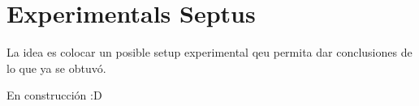 \chapter{Experimentals Septus}
La idea es colocar un posible setup experimental qeu permita dar conclusiones de lo que ya se obtuvó.

En construcción :D